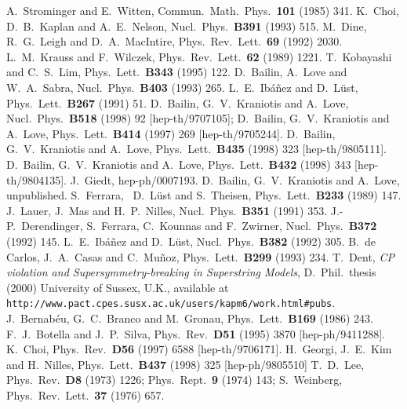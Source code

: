 \documentclass[a4paper,12pt]{article}
\begin{document}
\begin{thebibliography}{99}
	A.~Strominger and E.~Witten,
	Commun.\ Math.\ Phys.\ {\bf 101} (1985) 341.
	K.~Choi, D.~B.~Kaplan and A.~E.~Nelson,
	Nucl.\ Phys.\ {\bf B391} (1993) 515.
	M.~Dine, R.~G.~Leigh and D.~A.~MacIntire,
	Phys.\ Rev.\ Lett.\ {\bf 69} (1992) 2030.
	L.~M.~Krauss and F.~Wilczek,
	Phys.\ Rev.\ Lett.\ {\bf 62} (1989) 1221.
	T.~Kobayashi and C.~S.~Lim,
	Phys.\ Lett.\ {\bf B343} (1995) 122.
	D.~Bailin, A.~Love and W.~A.~Sabra,
	Nucl.\ Phys.\ {\bf B403} (1993) 265.
	L.~E.~Ib\'a\~nez and D.~L\"ust,
	Phys.\ Lett.\ {\bf B267} (1991) 51.
	D.~Bailin, G.~V.~Kraniotis and A.~Love,
	Nucl.\ Phys.\ {\bf B518} (1998) 92 [hep-th/9707105]; 
	D.~Bailin, G.~V.~Kraniotis and A.~Love,
	Phys.\ Lett.\ {\bf B414} (1997) 269 [hep-th/9705244].
	D.~Bailin, G.~V.~Kraniotis and A.~Love,
	Phys.\ Lett.\ {\bf B435} (1998) 323 [hep-th/9805111].
	D.~Bailin, G.~V.~Kraniotis and A.~Love,
	Phys.\ Lett.\ {\bf B432} (1998) 343 [hep-th/9804135].
	J.~Giedt,
	hep-ph/0007193.
	D.~Bailin, G.~V.~Kraniotis and A.~Love, unpublished.
	S.~Ferrara, ~D.~L\"ust and S.~Theisen,
	Phys.\ Lett.\ {\bf B233} (1989) 147.
	J.~Lauer, J.~Mas and H.~P.~Nilles,
	Nucl.\ Phys.\ {\bf B351} (1991) 353.
	J.-P.~Derendinger, S.~Ferrara, C.~Kounnas and F.~Zwirner,
	Nucl.\ Phys.\ {\bf B372} (1992) 145.
	L.~E.~Ib\'a\~nez and D.~L\"ust,
	Nucl.\ Phys.\ {\bf B382} (1992) 305.
	B.~de Carlos, J.~A.~Casas and C.~Mu\~noz,
	Phys.\ Lett.\ {\bf B299} (1993) 234.
	T.~Dent, {\em CP violation and Supersymmetry-breaking in Superstring Models}\/, D.~Phil.\ thesis (2000) University of Sussex, U.K., available at \mbox{\tt http://www.pact.cpes.susx.ac.uk/users/kapm6/work.html\#pubs}.
	J.~Bernab\'eu, G.~C.~Branco and M.~Gronau,
	Phys.\ Lett.\ {\bf B169} (1986) 243.
	F.~J.~Botella and J.~P.~Silva,
	Phys.\ Rev.\ {\bf D51} (1995) 3870 [hep-ph/9411288].
	K.~Choi,
	Phys.\ Rev.\ {\bf D56} (1997) 6588 [hep-th/9706171].
	H.~Georgi, J.~E.~Kim and H.~Nilles,
	Phys.\ Lett.\ {\bf B437} (1998) 325 [hep-ph/9805510]
	T.~D.~Lee,
	Phys.\ Rev.\ {\bf D8} (1973) 1226;
	Phys.\ Rept.\ {\bf 9} (1974) 143;
	S.~Weinberg,
	Phys.\ Rev.\ Lett.\ {\bf 37} (1976) 657.

\end{thebibliography}
\end{document}
